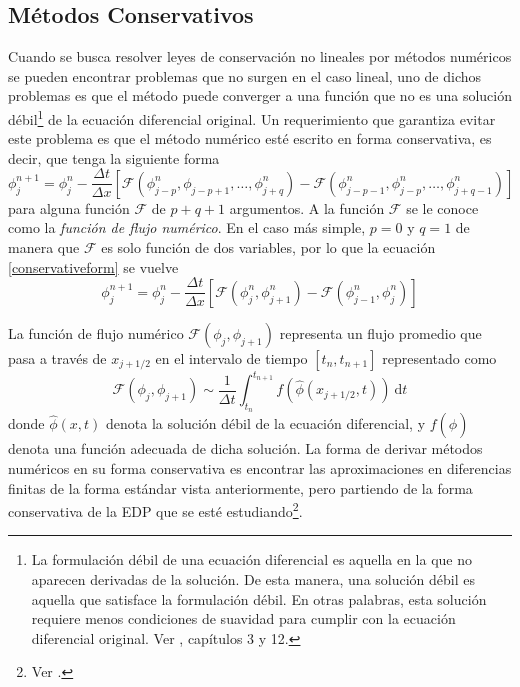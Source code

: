 \documentclass[11pt,twoside,openright,spanish]{report}
\numberwithin{equation}{chapter}
\numberwithin{figure}{chapter}
\numberwithin{table}{chapter}
\begin{document}
\subsection{Métodos Conservativos}
\noindent
Cuando se busca resolver leyes de conservación no lineales por métodos numéricos se pueden encontrar problemas que no surgen en el caso lineal, uno de dichos problemas es que el método puede converger a una función que no es una solución débil\footnote{La formulación débil de una ecuación diferencial es aquella en la que no aparecen derivadas de la solución. De esta manera, una solución débil es aquella que satisface la formulación débil. En otras palabras, esta solución requiere menos condiciones de suavidad para cumplir con la ecuación diferencial original. Ver \citet{levequenmcl}, capítulos 3 y 12.} de la ecuación diferencial original. Un requerimiento que garantiza evitar este problema es que el método numérico esté escrito en forma conservativa, es decir, que tenga la siguiente forma 
\begin{equation}
\phi_j^{n+1}=\phi_j^n -\frac{\Delta t}{\Delta x}\left[\mathcal{F}\left(\phi_{j-p}^n,\phi_{j-p+1},\dots,\phi^n_{j+q}\right)-\mathcal{F}\left(\phi^n_{j-p-1},\phi^n_{j-p},\dots,\phi^n_{j+q-1}\right)\right]
\label{conservativeform}
\end{equation}
para alguna función $\mathcal{F}$ de $p+q+1$ argumentos. A la función $\mathcal{F}$ se le conoce como la \textit{función de flujo numérico}. En el caso más simple, $p=0$ y $q=1$ de manera que $\mathcal{F}$ es solo función de dos variables, por lo que la ecuación \eqref{conservativeform} se vuelve
\begin{equation}
\phi_{j}^{n+1}=\phi_j^n-\frac{\Delta t}{\Delta x}\left[\mathcal{F}\left(\phi_j^n,\phi_{j+1}^n\right)- \mathcal{F}\left(\phi_{j-1}^n,\phi_j^n\right)\right]
\end{equation}

La función de flujo numérico $\mathcal{F}\left(\phi_j,\phi_{j+1}\right)$ representa un flujo promedio que pasa a través de $x_{j+1/2}$ en el intervalo de tiempo $\left[t_n,t_{n+1}\right]$ representado como
\begin{equation}
\mathcal{F}\left(\phi_j,\phi_{j+1}\right)\sim\frac{1}{\Delta t}\int_{t_n}^{t_{n+1}}f\left(\hat{\phi}\left(x_{j+1/2},t\right)\right)\ \text{d}t
\end{equation} 
donde $\hat{\phi}(x,t)$ denota la solución débil de la ecuación diferencial, y $f(\hat{\phi})$ denota una función adecuada de dicha solución. La forma de derivar métodos numéricos en su forma conservativa es encontrar las aproximaciones en diferencias finitas de la forma estándar vista anteriormente, pero partiendo de la forma conservativa de la EDP que se esté estudiando\footnote{Ver \citet[pág. 124-125]{levequenmcl}.}.
\end{document}
